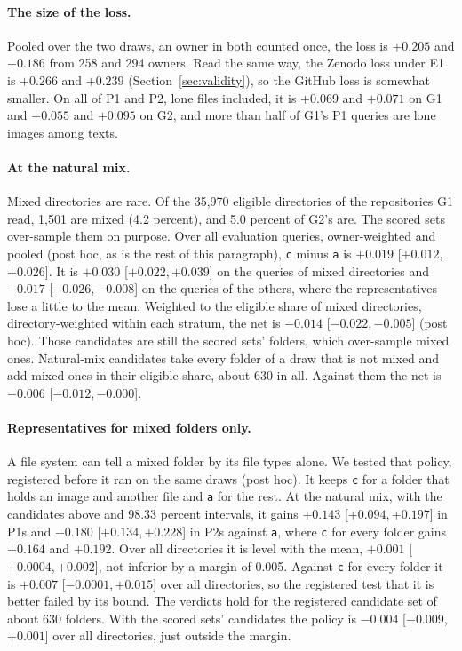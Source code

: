 \documentclass[sigconf,natbib=true,anonymous=true]{acmart}
\newcommand{\rep}[1]{\texttt{#1}}
\newcommand{\ci}[2]{[\ensuremath{#1},\,\ensuremath{#2}]}  %
\begin{document}
\paragraph{The size of the loss.} Pooled over the two draws, an owner in both counted once, the loss is $+0.205$ and $+0.186$ from 258 and 294 owners. Read the same way, the Zenodo loss under E1 is $+0.266$ and $+0.239$ (Section~\ref{sec:validity}), so the GitHub loss is somewhat smaller. On all of P1 and P2, lone files included, it is $+0.069$ and $+0.071$ on G1 and $+0.055$ and $+0.095$ on G2, and more than half of G1's P1 queries are lone images among texts.

\paragraph{At the natural mix.} Mixed directories are rare. Of the 35,970 eligible directories of the repositories G1 read, 1,501 are mixed (4.2 percent), and 5.0 percent of G2's are. The scored sets over-sample them on purpose. Over all evaluation queries, owner-weighted and pooled (post hoc, as is the rest of this paragraph), \rep{c} minus \rep{a} is $+0.019$ \ci{+0.012}{+0.026}. It is $+0.030$ \ci{+0.022}{+0.039} on the queries of mixed directories and $-0.017$ \ci{-0.026}{-0.008} on the queries of the others, where the representatives lose a little to the mean. Weighted to the eligible share of mixed directories, directory-weighted within each stratum, the net is $-0.014$ \ci{-0.022}{-0.005} (post hoc). Those candidates are still the scored sets' folders, which over-sample mixed ones. Natural-mix candidates take every folder of a draw that is not mixed and add mixed ones in their eligible share, about 630 in all. Against them the net is $-0.006$ \ci{-0.012}{-0.000}.

\paragraph{Representatives for mixed folders only.} A file system can tell a mixed folder by its file types alone. We tested that policy, registered before it ran on the same draws (post hoc). It keeps \rep{c} for a folder that holds an image and another file and \rep{a} for the rest. At the natural mix, with the candidates above and 98.33 percent intervals, it gains $+0.143$ \ci{+0.094}{+0.197} in P1s and $+0.180$ \ci{+0.134}{+0.228} in P2s against \rep{a}, where \rep{c} for every folder gains $+0.164$ and $+0.192$. Over all directories it is level with the mean, $+0.001$ \ci{+0.0004}{+0.002}, not inferior by a margin of 0.005. Against \rep{c} for every folder it is $+0.007$ \ci{-0.0001}{+0.015} over all directories, so the registered test that it is better failed by its bound. The verdicts hold for the registered candidate set of about 630 folders. With the scored sets' candidates the policy is $-0.004$ \ci{-0.009}{+0.001} over all directories, just outside the margin.
\end{document}
